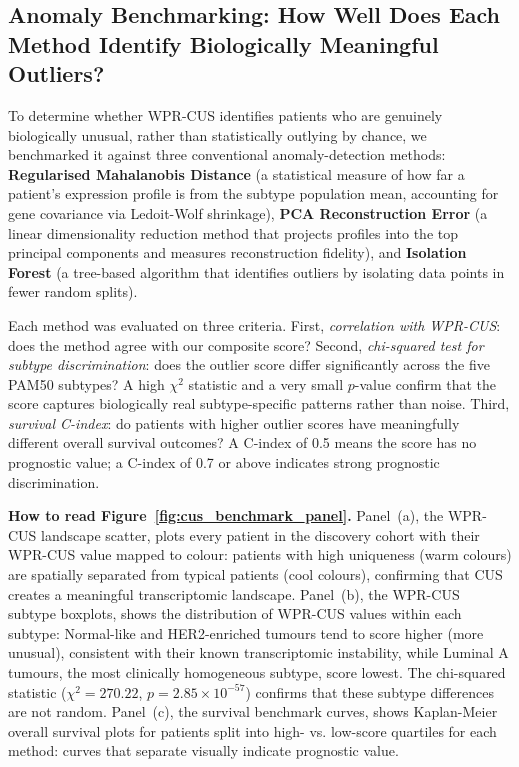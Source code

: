 \documentclass[10pt,a4paper,twocolumn]{article}
\begin{document}
\subsection{Anomaly Benchmarking: How Well Does Each Method Identify Biologically Meaningful Outliers?}

To determine whether WPR-CUS identifies patients who are genuinely biologically unusual, rather than statistically outlying by chance, we benchmarked it against three conventional anomaly-detection methods: \textbf{Regularised Mahalanobis Distance} (a statistical measure of how far a patient's expression profile is from the subtype population mean, accounting for gene covariance via Ledoit-Wolf shrinkage), \textbf{PCA Reconstruction Error} (a linear dimensionality reduction method that projects profiles into the top principal components and measures reconstruction fidelity), and \textbf{Isolation Forest} (a tree-based algorithm that identifies outliers by isolating data points in fewer random splits).

Each method was evaluated on three criteria. First, \textit{correlation with WPR-CUS}: does the method agree with our composite score? Second, \textit{chi-squared test for subtype discrimination}: does the outlier score differ significantly across the five PAM50 subtypes? A high $\chi^2$ statistic and a very small $p$-value confirm that the score captures biologically real subtype-specific patterns rather than noise. Third, \textit{survival C-index}: do patients with higher outlier scores have meaningfully different overall survival outcomes? A C-index of 0.5 means the score has no prognostic value; a C-index of 0.7 or above indicates strong prognostic discrimination.

\textbf{How to read Figure~\ref{fig:cus_benchmark_panel}.} Panel~(a), the WPR-CUS landscape scatter, plots every patient in the discovery cohort with their WPR-CUS value mapped to colour: patients with high uniqueness (warm colours) are spatially separated from typical patients (cool colours), confirming that CUS creates a meaningful transcriptomic landscape. Panel~(b), the WPR-CUS subtype boxplots, shows the distribution of WPR-CUS values within each subtype: Normal-like and HER2-enriched tumours tend to score higher (more unusual), consistent with their known transcriptomic instability, while Luminal A tumours, the most clinically homogeneous subtype, score lowest. The chi-squared statistic ($\chi^2 = 270.22$, $p = 2.85 \times 10^{-57}$) confirms that these subtype differences are not random. Panel~(c), the survival benchmark curves, shows Kaplan-Meier overall survival plots for patients split into high- vs. low-score quartiles for each method: curves that separate visually indicate prognostic value.
\end{document}
